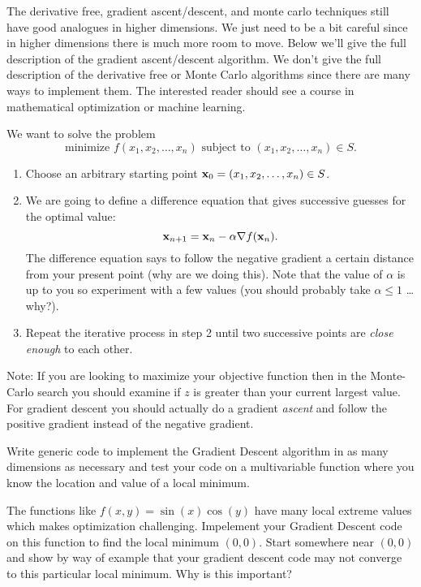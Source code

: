 The derivative free, gradient ascent/descent, and monte carlo techniques still have good
analogues in higher dimensions.  We just need to be a bit careful since in higher
dimensions there is much more room to move.  Below we'll give the full description of the
gradient ascent/descent algorithm.  We don't give the full description of the derivative
free or Monte Carlo algorithms since there are many ways to implement them.  The
interested reader should see a course in mathematical optimization or machine learning.

\begin{algorithm}
    We want to solve the problem 
    \[ \text{minimize } f(x_1, x_2, \ldots, x_n) \text{ subject to }(x_1, x_2, \ldots, x_n) \in S. \]
    \begin{enumerate}
        \item Choose an arbitrary starting point ${\bf x}_0 = (x_1,x_2,\ldots,x_n)\in S$.
        \item We are going to define a difference equation that gives successive guesses
            for the optimal value:
            \[ {\bf x}_{n+1} = {\bf x}_n - \alpha \nabla f({\bf x}_n). \]
            The difference equation says to follow the negative gradient a certain
            distance from your present point (why are we doing this).  Note that the value
            of $\alpha$ is up to you so experiment with a few values (you should probably
            take $\alpha \le 1$ \ldots why?).
        \item Repeat the iterative process in step 2 until two successive points are {\it
            close enough} to each other.
    \end{enumerate}
\end{algorithm}
Note: If you are looking to maximize your objective function then in the Monte-Carlo
search you should examine if $z$ is greater than your current largest value.  For gradient
descent you should actually do a gradient {\it
ascent} and follow the positive gradient instead of the negative gradient.

\begin{problem}
    Write generic code to implement the Gradient Descent algorithm in as many dimensions
    as necessary and test your code on a multivariable function where you know the
    location and value of a local minimum.
\end{problem}

\begin{problem}
    The functions like $f(x,y) = \sin(x)\cos(y)$ have many local extreme values which makes
    optimization challenging.  Impelement your Gradient Descent code on this function to
    find the local minimum $(0,0)$.  Start somewhere near $(0,0)$ and show by way of
    example that your gradient descent code may not converge to this particular local
    minimum. Why is this important?
\end{problem}



